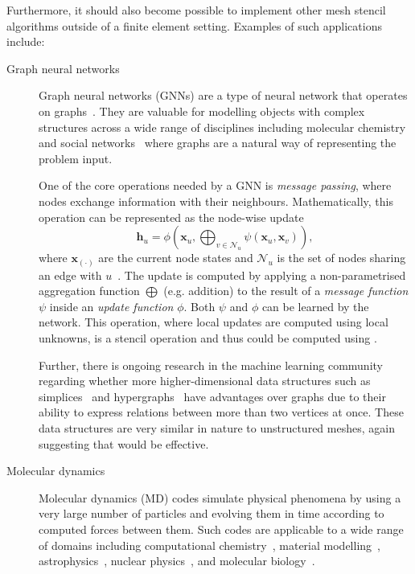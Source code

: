 \documentclass[thesis]{subfiles}
\begin{document}
Furthermore, it should also become possible to implement other mesh stencil algorithms outside of a finite element setting.
Examples of such applications include:
\begin{description}
  \item[Graph neural networks]
    Graph neural networks (GNNs) are a type of neural network that operates on graphs~\cite{scarselliGraphNeuralNetwork2009}.
    They are valuable for modelling objects with complex structures across a wide range of disciplines including molecular chemistry~\cite{stokesDeepLearningApproach2020} and social networks~\cite{montiFakeNewsDetection2019} where graphs are a natural way of representing the problem input.

    One of the core operations needed by a GNN is \emph{message passing}, where nodes exchange information with their neighbours.
    Mathematically, this operation can be represented as the node-wise update
    \begin{equation}
      \mathbf{h}_u = \phi \left( \mathbf{x}_u, \bigoplus_{v \in \mathcal{N}_u} \psi(\mathbf{x}_u, \mathbf{x}_v) \right),
    \end{equation}
    where $\mathbf{x}_{(\cdot)}$ are the current node states and $\mathcal{N}_u$ is the set of nodes sharing an edge with $u$~\cite{bronsteinGeometricDeepLearning2021}.
    The update is computed by applying a non-parametrised aggregation function $\bigoplus$ (e.g. addition) to the result of a \emph{message function} $\psi$ inside an \emph{update function} $\phi$.
    Both $\psi$ and $\phi$ can be learned by the network.
    This operation, where local updates are computed using local unknowns, is a stencil operation and thus could be computed using .

    Further, there is ongoing research in the machine learning community regarding whether more higher-dimensional data structures such as simplices~\cite{hwangMultiorderSimplexBasedGraph2024} and hypergraphs~\cite{fengHypergraphNeuralNetworks2019} have advantages over graphs due to their ability to express relations between more than two vertices at once.
    These data structures are very similar in nature to unstructured meshes, again suggesting that  would be effective.
  \item[Molecular dynamics]
    Molecular dynamics (MD) codes simulate physical phenomena by using a very large number of particles and evolving them in time according to computed forces between them.
    Such codes are applicable to a wide range of domains including computational chemistry~\cite{vangunsterenComputerSimulationMolecular1990}, material modelling~\cite{LAMMPS}, astrophysics~\cite{horowitzNeutronStarCrust2011}, nuclear physics~\cite{williamsAtomisticInvestigationStructure2015}, and molecular biology~\cite{hollingsworthMolecularDynamicsSimulation2018}.


\end{description}
\end{document}

